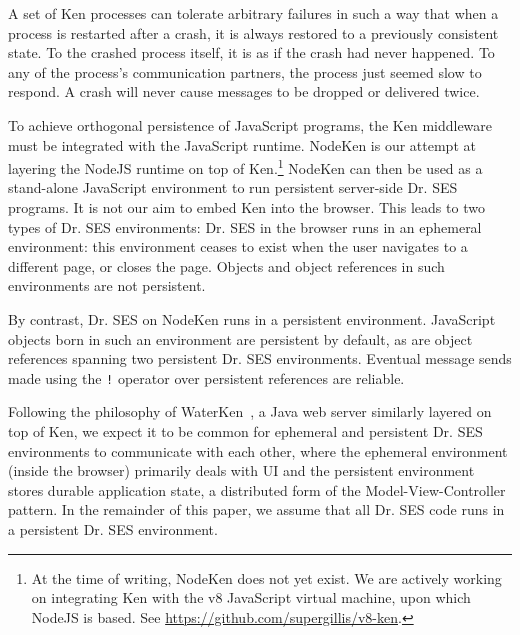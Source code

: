 \documentclass{llncs}
\begin{document}
A set of Ken processes can tolerate arbitrary failures in such a way that when a process is restarted after a crash, it is always restored to a previously consistent state. To the crashed process itself, it is as if the crash had never happened. To any of the process's communication partners, the process just seemed slow to respond. A crash will never cause messages to be dropped or delivered twice.

To achieve orthogonal persistence of JavaScript programs, the Ken middleware must be integrated with the JavaScript runtime. NodeKen is our attempt at layering the NodeJS runtime on top of Ken.\footnote{
%
At the time of writing, NodeKen does not yet exist. We are actively working on integrating Ken with the v8 JavaScript virtual machine, upon which NodeJS is based. See \url{https://github.com/supergillis/v8-ken}.
%
} NodeKen can then be used as a stand-alone JavaScript environment to run persistent server-side Dr. SES programs. It is not our aim to embed Ken into the browser. This leads to two types of Dr. SES environments: Dr. SES in the browser runs in an ephemeral environment: this environment ceases to exist when the user navigates to a different page, or closes the page. Objects and object references in such environments are not persistent. 

By contrast, Dr. SES on NodeKen runs in a persistent environment. JavaScript objects born in such an environment are persistent by default, as are object references spanning two persistent Dr. SES environments. Eventual message sends made using the {\tt !} operator over persistent references are reliable.



Following the philosophy of WaterKen~\cite{Close:Waterken}, a Java web server similarly layered on top of Ken, we expect it to be common for ephemeral and persistent Dr. SES environments to communicate with each other, where the ephemeral environment (inside the browser) primarily deals with UI and the persistent environment stores durable application state, a distributed form of the Model-View-Controller pattern. In the remainder of this paper, we assume that all Dr. SES code runs in a persistent Dr. SES environment.
\end{document}
